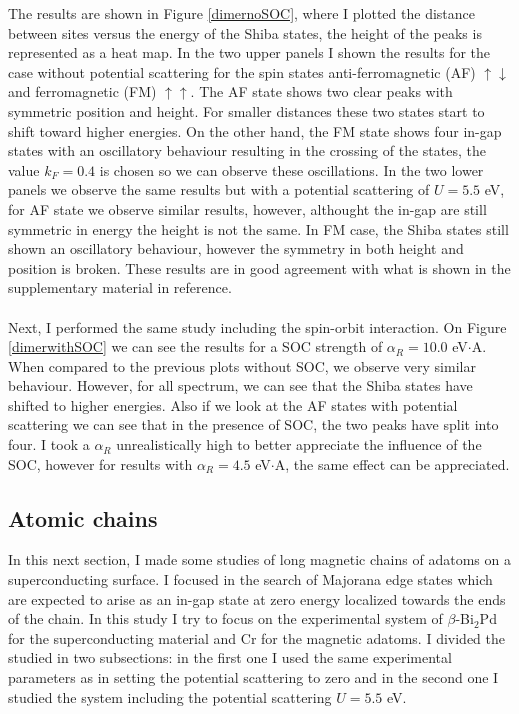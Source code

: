 \documentclass[letterpaper,12pt]{article}
\begin{document}
The results are shown in Figure \ref{dimernoSOC}, where I plotted the distance between sites versus the energy of the Shiba states, the height of the peaks is represented as a heat map. In the two upper panels I shown the results for the case without potential scattering for the spin states anti-ferromagnetic (AF) $\uparrow\downarrow$ and ferromagnetic (FM) $\uparrow\uparrow$. The AF state shows two clear peaks with symmetric position and height. For smaller distances these two states start to shift toward higher energies. On the other hand, the FM state shows four in-gap states with an oscillatory behaviour resulting in the crossing of the states, the value $k_F = 0.4$ is chosen so we can observe these oscillations. In the two lower panels we observe the same results but with a potential scattering of $U = 5.5$ eV, for AF state we observe similar results, however, althought the in-gap are still symmetric in energy the height is not the same. In FM case, the Shiba states still shown an oscillatory behaviour, however the symmetry in both height and position is broken. These results are in good agreement with what is shown in the supplementary material in reference\cite{DJ}.\\ \\   
Next, I performed the same study including the spin-orbit interaction. On Figure \ref{dimerwithSOC} we can see the results for a SOC strength of $\alpha_R =10.0$ eV$\cdot$A. When compared to the previous plots without SOC, we observe very similar behaviour. However, for all spectrum, we can see that the Shiba states have shifted to higher energies. Also if we look at the AF states with potential scattering we can see that in the presence of SOC, the two peaks have split into four. I took a $\alpha_R$ unrealistically high to better appreciate the influence of the SOC, however for results with $\alpha_R = 4.5$ eV$\cdot$A, the same effect can be appreciated.

 
\subsection{Atomic chains}
In this next section, I made some studies of long magnetic chains of adatoms on a superconducting surface. I focused in the search of Majorana edge states which are expected to arise as an in-gap state at zero energy localized towards the ends of the chain. In this study I try to focus on the experimental system of $\beta$-Bi$_2$Pd for the superconducting material and Cr for the magnetic adatoms. I divided the studied in two subsections: in the first one I used the same experimental parameters as in \cite{DJ} setting the potential scattering to zero and in the second one I studied the system including the potential scattering $U = 5.5$ eV.
\end{document}

